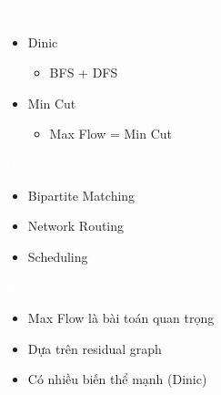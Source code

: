 \documentclass{beamer}
\newcommand{\hlblue}[1]{\textcolor{myblue}{#1}}
\newcommand{\hlpurple}[1]{\textcolor{mypurple}{#1}}
\newcommand{\hlwhite}[1]{\textcolor{white}{#1}}
\begin{document}

\begin{frame}{\hlwhite{Nâng cao}}
\begin{itemize}
\item \hlblue{Dinic}
\begin{itemize}
\item BFS + DFS
\end{itemize}

\item \hlpurple{Min Cut}
\begin{itemize}
\item Max Flow = Min Cut
\end{itemize}
\end{itemize}
\end{frame}


\begin{frame}{\hlwhite{Ứng dụng}}
\begin{itemize}
\item Bipartite Matching
\item Network Routing
\item Scheduling
\end{itemize}
\end{frame}


\begin{frame}{\hlwhite{Kết luận}}
\begin{itemize}
\item Max Flow là bài toán quan trọng
\item Dựa trên residual graph
\item Có nhiều biến thể mạnh (Dinic)
\end{itemize}
\end{frame}
\end{document}
